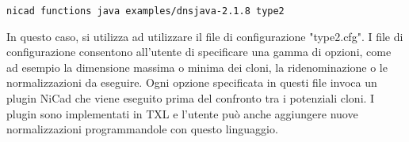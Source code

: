 \begin{center}
\verb|nicad functions java examples/dnsjava-2.1.8 type2|
\end{center}

In questo caso, si utilizza ad utilizzare il file di configurazione "type2.cfg".
I file di configurazione consentono all'utente di specificare una gamma di opzioni, come ad esempio la dimensione massima o minima dei cloni, la ridenominazione o le normalizzazioni da eseguire. Ogni opzione specificata in questi file invoca un plugin NiCad che viene eseguito prima del confronto tra i potenziali cloni. I plugin sono implementati in TXL e l'utente può anche aggiungere nuove normalizzazioni programmandole con questo linguaggio.







